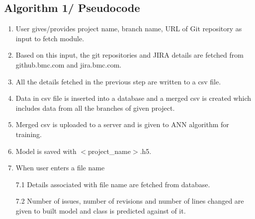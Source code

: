 \documentclass[oneside,a4paper,12pt]{book}
\begin{document}
\subsection{Algorithm 1/ Pseudocode}

\begin{enumerate}
	\item User gives/provides project name, branch name, URL of Git repository as input to fetch module.\par

	\item Based on this input, the git repositories and JIRA details are fetched from github.bmc.com and jira.bmc.com.\par

	\item All the details fetched in the previous step are written to a csv file.\par

	\item Data in csv file is inserted into a database and a merged csv is created which includes data from all the branches of given project.\par

	\item Merged csv is uploaded to a server and is given to ANN algorithm for training.\par

	\item Model is saved with $<$project\_name$>$.h5.\par

	\item When user enters a file name



\begin{justify}
7.1 Details associated with file name are fetched from database.
\end{justify}\par




\begin{justify}
7.2 Number of issues, number of revisions and number of lines changed \tab are given to built model and class is predicted against of it.
\end{justify}\par



\par

\end{enumerate}\par
\end{document}

